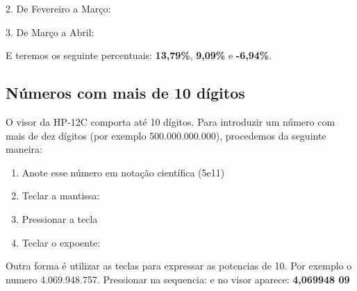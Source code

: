 2. De Fevereiro a Março: \\
     \keystroke{$\bigtriangleup \%$}

3. De Março a Abril: \\
     \keystroke{$\bigtriangleup \%$}

E teremos os seguinte percentuais: \textbf{13,79\%}, \textbf{9,09\%} e \textbf{-6,94\%}.

\subsection*{Números com mais de 10 dígitos}
O visor da HP-12C comporta até 10 dígitos. Para introduzir um número com mais de dez dígitos (por exemplo 500.000.000.000), procedemos da seguinte maneira: \vspace{-1em}
\begin{enumerate}
	\item Anote esse número em notação científica (5e11)
	\item Teclar a mantissa: 
	\item Pressionar a tecla 
	\item Teclar o expoente: 
\end{enumerate}
	
Outra forma é utilizar as teclas   para expressar as potencias de 10. Por exemplo o numero 4.069.948.757. Pressionar na sequencia:             e no visor aparece: \textbf{4,069948 09}